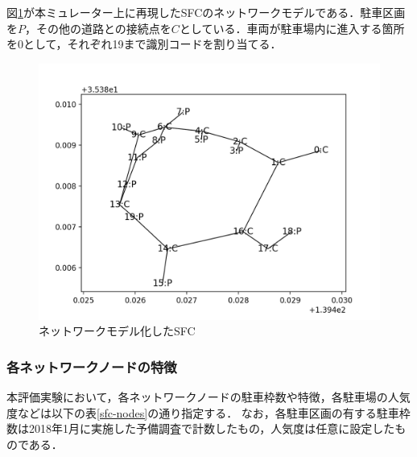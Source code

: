 図\ref{sfc-network-model}が本ミュレーター上に再現したSFCのネットワークモデルである．駐車区画を$P$，その他の道路との接続点を$C$としている．車両が駐車場内に進入する箇所を0として，それぞれ19まで識別コードを割り当てる．

\begin{figure}
	\centering
	\includegraphics[width=12cm]{fig/place-sfc.png}
	\caption{ネットワークモデル化したSFC}
	\label{sfc-network-model}
\end{figure}

\subsubsection{各ネットワークノードの特徴}
本評価実験において，各ネットワークノードの駐車枠数や特徴，各駐車場の人気度などは以下の表\ref{sfc-nodes}の通り指定する．
なお，各駐車区画の有する駐車枠数は2018年1月に実施した予備調査で計数したもの，人気度は任意に設定したものである．

